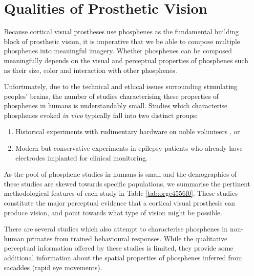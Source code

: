 \documentclass[a4paper,11pt,openany]{book}
\begin{document}
\chapter{Qualities of Prosthetic Vision}
\label{sec:orgee41574}
\label{orge5a5eac}

Because cortical visual prostheses use phosphenes as the fundamental building block of prosthetic vision, it is imperative that we be able to compose multiple phosphenes into meaningful imagery.
Whether phosphenes can be composed meaningfully depends on the visual and perceptual properties of phosphenes such as their size, color and interaction with other phosphenes.

Unfortunately, due to the technical and ethical issues surrounding stimulating peoples' brains, the number of studies characterising these properties of phosphenes in humans is understandably small.
Studies which characterise phosphenes evoked \emph{in vivo} typically fall into two distinct groups:

\begin{enumerate}
\item Historical experiments with rudimentary hardware on noble volunteers \cite{brindley_sensations_1968,dobelle_artificial_1974,bak_visual_1990}, or
\item Modern but conservative experiments in epilepsy patients who already have electrodes implanted for clinical monitoring. \cite{lee_mapping_2000,winawer_linking_2016,murphey_perceiving_2009,bosking_electrical_2017,collins_preserved_2019}
\end{enumerate}

As the pool of phosphene studies in humans is small and the demographics of these studies are skewed towards specific populations, we summarise the pertinent methodological features of each study in Table \ref{tab:orge4556f0}.
These studies constitute the major perceptual evidence that a cortical visual prosthesis can produce vision, and point towards what type of vision might be possible.

There are several studies which also attempt to characterise phosphenes in non-human primates from trained behavioural responses. \cite{tehovnik_phosphene_2005,tehovnik_phosphene_2007,tehovnik_microstimulation_2007,tehovnik_microstimulation_2009}
While the qualitative perceptual information offered by these studies is limited, they provide some additional information about the spatial properties of phosphenes inferred from sacaddes (rapid eye movements).
\end{document}
